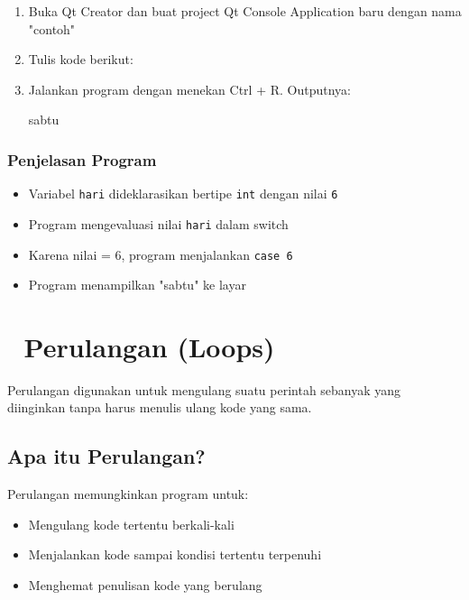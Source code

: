 \begin{enumerate}
\item Buka Qt Creator dan buat project Qt Console Application baru dengan nama "contoh"
\item Tulis kode berikut:



\item Jalankan program dengan menekan Ctrl + R. Outputnya:

\begin{lcverbatim}
sabtu
\end{lcverbatim}
\end{enumerate}

\subsubsection*{Penjelasan Program}

\begin{itemize}
\item Variabel \texttt{hari} dideklarasikan bertipe \texttt{int} dengan nilai \texttt{6}
\item Program mengevaluasi nilai \texttt{hari} dalam switch
\item Karena nilai = 6, program menjalankan \texttt{case 6}
\item Program menampilkan "sabtu" ke layar
\end{itemize}

\section{🔄 Perulangan (Loops)}\label{perulangan}

Perulangan digunakan untuk mengulang suatu perintah sebanyak yang diinginkan tanpa harus menulis ulang kode yang sama.

\subsection{Apa itu Perulangan?}

Perulangan memungkinkan program untuk:
\begin{itemize}
\item Mengulang kode tertentu berkali-kali
\item Menjalankan kode sampai kondisi tertentu terpenuhi
\item Menghemat penulisan kode yang berulang
\end{itemize}

